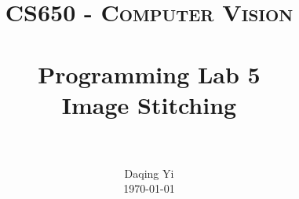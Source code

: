 \documentclass[paper=a4, fontsize=11pt]{scrartcl}
\title{
		\usefont{OT1}{bch}{b}{n}
		\normalfont \normalsize \textsc{CS650 - Computer Vision} \\ [25pt]
		\horrule{0.5pt} \\[0.4cm]
		\huge Programming Lab 5 \\ Image Stitching \\
		\horrule{2pt} \\[0.5cm]
}
\author{
		\normalfont 								\normalsize
        Daqing Yi\\[-3pt]		\normalsize
        \today
}
\date{}
\begin{document}
\maketitle

\begin{comment}
Step 1: Calculate Homography 
 high-contrast corners (Manual)
Step 2: Warp images
 backward mapping method (bilinear interpolation)
 
Extra credits:
(1) stitch the images by using a simple blending of them
(2) Use linear regression (more than four points)
(3) Use RANSAC (support bad point matches)
(4) Find points automatically using point detectors
\end{comment}






\end{document}
